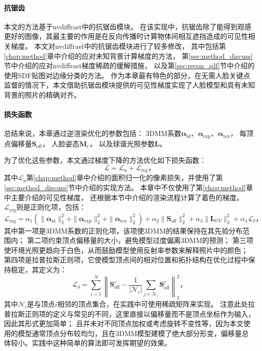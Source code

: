 \paragraph{抗锯齿}
本文的方法基于nvdiffrast中的抗锯齿模块。
在该实现中，抗锯齿除了能得到观感更好的图像，其最主要的作用是在反向传播时计算物体间相互遮挡造成的可见性相关梯度。
本文对nvdiffrast中的抗锯齿模块进行了较多修改，
其中包括第\ref{chap:method}章中介绍的应对未知背景计算梯度的方法，
第\ref{sec:method_discuss}节中介绍的应对nvdiffrast梯度稀疏的缓解措施，
以及第\ref{sec:recon_sdf}节中介绍的使用SDF贴图对边缘分类的方法。
作为本章最有特色的部分，在无需人脸关键点监督的情况下，本文借助抗锯齿模块提供的可见性梯度实现了人脸模型和具有未知背景的照片的精确对齐。

\paragraph{损失函数}
总结来说，本章通过逆渲染优化的参数包括：
3DMM系数$\mathbf{\alpha}_\mathrm{id}$、$\mathbf{\alpha}_\mathrm{exp}$、$\mathbf{\alpha}_\mathrm{tex}$，
每顶点偏移量$\mathbf{S}_\mathrm{off}$，
人脸姿态$\mathbf{M}_\mathrm{c}$，
以及球谐光照参数$\mathbf{L}$。

为了优化这些参数，本文通过梯度下降的方法优化如下损失函数：
\begin{equation}
    \mathcal{L} = \mathcal{L}_\mathrm{n} + \mathcal{L}_\mathrm{reg}
    \text{，}
\end{equation}
其中$\mathcal{L}_\mathrm{n}$第\ref{chap:method}章中介绍的面积归一化的像素损失，并使用了第\ref{sec:method_discuss}节中介绍的实现方法。
本章中不仅使用了第\ref{chap:method}章中主要介绍的可见性梯度，
还根据本节中介绍的渲染流程计算了着色的梯度。
$\mathcal{L}_\mathrm{reg}$则是正则化项，包括：
\begin{equation}
\mathcal{L}_\mathrm{reg} = \alpha_1\left(\| \mathbf{\alpha}_\mathrm{id} \|_2^2 +
    \| \mathbf{\alpha}_\mathrm{exp} \|_2^2 +
    \| \mathbf{\alpha}_\mathrm{tex} \|_2^2\right) +
    \alpha_2 \| \mathbf{S}_\mathrm{off} \|_2^2 +
    \alpha_3 \| \mathbf{L}_{UV} \|_2^2 +
    \alpha_4 \mathcal{L}_\delta
    \text{，}
\end{equation}
其中第一项是3DMM系数的正则化项，该项使3DMM的结果保持在其先验分布范围内；
第二项约束顶点偏移量的大小，避免模型过度偏离3DMM的预测；
第三项使环境光照更趋向于白色，从而鼓励模型使用反射率参数来解释照片中的颜色；
第四项是拉普拉斯正则项，它使模型顶点间的相对位置和拓扑结构在优化过程中保持稳定，其定义为：
\begin{equation}
    \mathcal{L}_\delta = \sum_{i=1}^N \left\|\mathbf{S}_\mathrm{off}^i - \frac{1}{|\mathcal{N}_i|}\sum_{j\in\mathcal{N}_i} \mathbf{S}_\mathrm{off}^j\right\|_2^2
    \text{，}
\end{equation}
其中$\mathcal{N}_i$是与顶点$i$相邻的顶点集合，在实践中可使用稀疏矩阵来实现。
注意此处拉普拉斯正则项的定义与常见的不同，这里直接以偏移量而不是顶点坐标作为输入，因此其形式更加简单；
且并未对不同顶点加权或考虑旋转不变性等，因为本文使用的模型通常顶点分布较均匀，且在3DMM模型建模了绝大部分形变，偏移量总体较小。实践中这种简单的算法即可发挥期望的效果。

